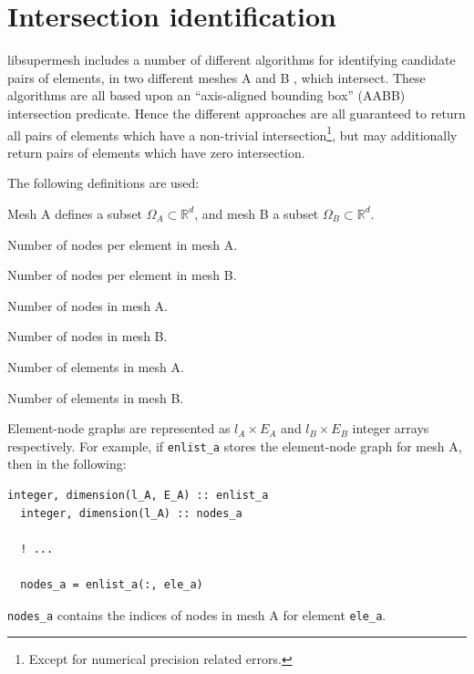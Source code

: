 \documentclass{article}
\begin{document}
\section{Intersection identification}

libsupermesh includes a number of different algorithms for identifying candidate
pairs of elements, in two different meshes A and B , which intersect. These
algorithms are all based upon an ``axis-aligned bounding box'' (AABB)
intersection predicate. Hence the different approaches are all guaranteed to
return all pairs of elements which have a non-trivial
intersection\footnote{Except for numerical precision related errors.}, but may
additionally return pairs of elements which have zero intersection.

The following definitions are used:
\begin{description}[leftmargin=\parindent,labelindent=\parindent]
  \item[$d$] Mesh A defines a subset $\Omega_A \subset \mathbb{R}^d$, and mesh B
    a subset $\Omega_B \subset \mathbb{R}^d$.
  \item[$l_A$] Number of nodes per element in mesh A.
  \item[$l_B$] Number of nodes per element in mesh B.
  \item[$V_A$] Number of nodes in mesh A.
  \item[$V_B$] Number of nodes in mesh B.
  \item[$E_A$] Number of elements in mesh A.
  \item[$E_B$] Number of elements in mesh B.
\end{description}

Element-node graphs are represented as $l_A \times E_A$ and
$l_B \times E_B$ integer arrays respectively. For example, if \verb+enlist_a+
stores the element-node graph for mesh A, then in the following:
\begin{lstlisting}[language=FORTRAN]
  integer, dimension(l_A, E_A) :: enlist_a
  integer, dimension(l_A) :: nodes_a
  
  ! ...

  nodes_a = enlist_a(:, ele_a)
\end{lstlisting}
\verb+nodes_a+ contains the indices of nodes in mesh A for element \verb+ele_a+.
\end{document}
